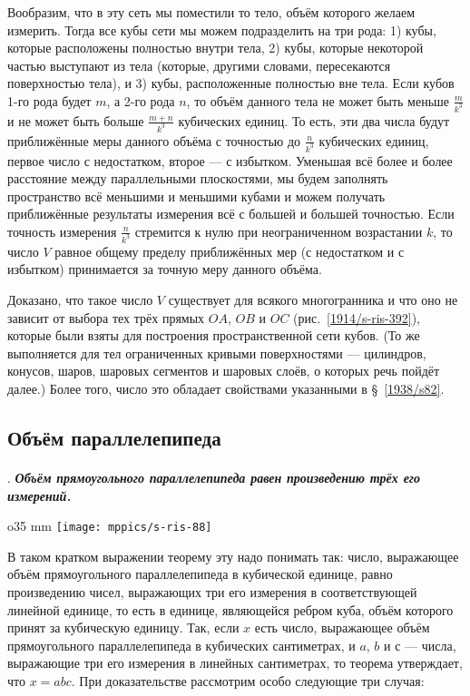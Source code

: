 {Вообразим, что в эту сеть мы поместили то тело, объём которого желаем измерить.
Тогда все кубы сети мы можем подразделить на три рода:
1) кубы, которые расположены полностью внутри тела, 
2) кубы, которые некоторой частью выступают из тела (которые, другими словами, пересекаются поверхностью тела), и  
3) кубы, расположенные полностью вне тела.
Если кубов 1-го рода будет $m$, а 2-го рода $n$, то объём данного тела не может быть меньше $\tfrac{m}{k^3}$ и не может быть больше $\tfrac{m+n}{k^3}$ кубических единиц.
То есть, эти два числа будут приближённые меры данного объёма с точностью до $\tfrac{n}{k^3}$ кубических единиц, первое число с недостатком, второе — с избытком.
Уменьшая всё более и более расстояние между параллельными плоскостями, мы будем заполнять пространство всё меньшими и меньшими кубами и можем получать приближённые результаты измерения всё с большей и большей точностью.
Если точность измерения $\tfrac{n}{k^3}$ стремится к нулю при неограниченном возрастании $k$,
то число $V$ равное общему пределу приближённых мер (с недостатком и с избытком) принимается за точную меру данного объёма. 

Доказано, что такое число $V$ существует для всякого многогранника и что оно не зависит от выбора тех трёх прямых $OA$, $OB$ и $OC$ (рис.~\ref{1914/s-ris-392}), которые были взяты для построения пространственной сети кубов.
(То же выполняется для тел ограниченных кривыми поверхностями — цилиндров, конусов, шаров, шаровых сегментов и шаровых слоёв, о которых речь пойдёт далее.)
Более того, число это обладает свойствами указанными в §~\ref{1938/s82}.

}

\subsection*{Объём параллелепипеда}

\paragraph{}\label{1938/s84}
.
\textbf{\emph{Объём прямоугольного параллелепипеда равен произведению трёх его измерений.}}

\begin{wrapfigure}{o}{35 mm}
\vskip-0mm
\centering
\texttt{[image: mppics/s-ris-88]}
\caption{}\label{1938/s-ris-88}
\vskip-0mm
\end{wrapfigure}

В таком кратком выражении теорему эту надо понимать так: число, выражающее объём прямоугольного параллелепипеда в кубической единице, равно произведению чисел, выражающих три его измерения в соответствующей линейной единице, то есть в единице, являющейся ребром куба, объём которого принят за кубическую единицу.
Так, если $x$ есть число, выражающее объём прямоугольного параллелепипеда в кубических сантиметрах, и $a$, $b$ и с — числа, выражающие три его измерения в линейных сантиметрах, то теорема утверждает, что $x=abc$.
При доказательстве рассмотрим особо следующие три случая:


